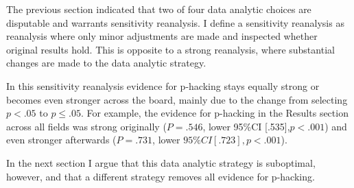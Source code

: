 The previous section indicated that two of four data analytic choices are disputable and warrants sensitivity reanalysis. I define a sensitivity reanalysis as reanalysis where only minor adjustments are made and inspected whether original results hold. This is opposite to a strong reanalysis, where substantial changes are made to the data analytic strategy.

In this sensitivity reanalysis evidence for p-hacking stays equally strong or becomes even stronger across the board, mainly due to the change from selecting $p<.05$ to $p\leq.05$. For example, the evidence for p-hacking in the Results section across all fields was strong originally ($P=.546$, lower 95\%CI [.535],$p<.001$) and even stronger afterwards ($P=.731$, lower $95\%CI [.723], p<.001$).

In the next section I argue that this data analytic strategy is suboptimal, however, and that a different strategy removes all evidence for p-hacking.
